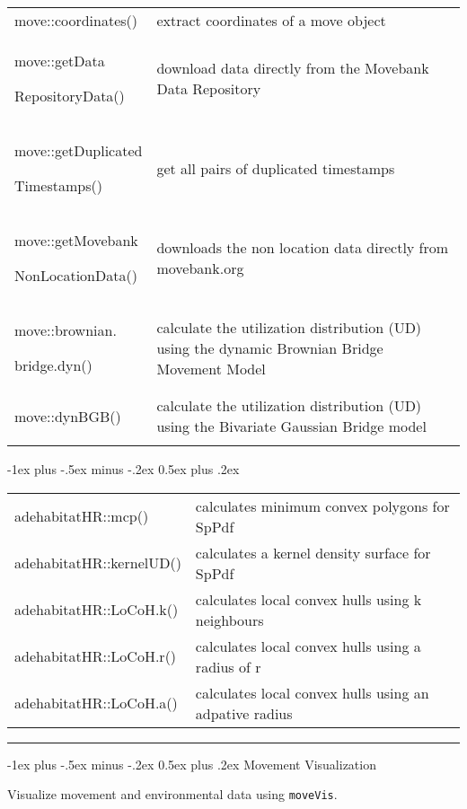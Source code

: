 \documentclass[a4paper,10pt,landscape]{article}
\makeatletter
\renewcommand{\section}{\@startsection{section}{1}{0mm}%
                                {-1ex plus -.5ex minus -.2ex}%
                                {0.5ex plus .2ex}%
                                {\normalfont\large\bfseries}}
\makeatother
\begin{document}
\begin{multicols}{3}
\begin{tabular}{@{}p{\the\MyLen}%
                @{}p{\linewidth-\the\MyLen}@{}}
move::coordinates() & extract coordinates of a move object\\
move::getData\par
RepositoryData() & download data directly from the Movebank Data Repository\\
move::getDuplicated\par
Timestamps() & get all pairs of duplicated timestamps\\
move::getMovebank\par
NonLocationData() & downloads the non location data directly from movebank.org\\
move::brownian.\par
bridge.dyn() & calculate the utilization distribution (UD) using the dynamic Brownian Bridge Movement Model\\
move::dynBGB() &  calculate the utilization distribution (UD) using the Bivariate Gaussian Bridge model\\
& 
\end{tabular}

\section{}
\begin{tabular}{@{}p{\the\MyLen}%
                @{}p{\linewidth-\the\MyLen}@{}}
adehabitatHR::mcp() & calculates minimum convex polygons for SpPdf \\
adehabitatHR::kernelUD() & calculates a kernel density surface for SpPdf \\
adehabitatHR::LoCoH.k() & calculates local convex hulls using k neighbours \\
adehabitatHR::LoCoH.r() & calculates local convex hulls using a radius of r \\
adehabitatHR::LoCoH.a() & calculates local convex hulls using an adpative radius \\
\end{tabular}


\quad
\rule{0.32\textwidth}{0.4pt}
\section{Movement Visualization}

Visualize movement and environmental data using \verb!moveVis!.


\end{multicols}
\end{document}
